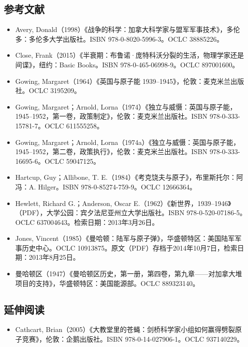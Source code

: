 \subsection{参考文献}
\begin{itemize}
\item Avery, Donald（1998）《战争的科学：加拿大科学家与盟军军事技术》，多伦多：多伦多大学出版社。ISBN 978-0-8020-5996-3。OCLC 38885226。
\item Close, Frank（2015）《半衰期：布鲁诺·庞特科沃分裂的生活，物理学家还是间谍》，纽约：Basic Books。ISBN 978-0-465-06998-9。OCLC 897001600。
\item Gowing, Margaret（1964）《英国与原子能 1939–1945》，伦敦：麦克米兰出版社。OCLC 3195209。
\item Gowing, Margaret；Arnold, Lorna（1974）《独立与威慑：英国与原子能，1945–1952，第一卷，政策制定》，伦敦：麦克米兰出版社。ISBN 978-0-333-15781-7。OCLC 611555258。
\item Gowing, Margaret；Arnold, Lorna（1974a）《独立与威慑：英国与原子能，1945–1952，第二卷，政策执行》，伦敦：麦克米兰出版社。ISBN 978-0-333-16695-6。OCLC 59047125。
\item Hartcup, Guy；Allibone, T. E.（1984）《考克饶夫与原子》，布里斯托尔：阿冯：A. Hilger。ISBN 978-0-85274-759-9。OCLC 12666364。
\item Hewlett, Richard G.；Anderson, Oscar E.（1962）《新世界，1939–1946》（PDF），大学公园：宾夕法尼亚州立大学出版社。ISBN 978-0-520-07186-5。OCLC 637004643。检索日期：2013年3月26日。
\item Jones, Vincent（1985）《曼哈顿：陆军与原子弹》，华盛顿特区：美国陆军军事历史中心。OCLC 10913875。原文（PDF）存档于2014年10月7日，检索日期：2013年8月25日。
\item 曼哈顿区（1947）《曼哈顿区历史，第一册，第四卷，第九章——对加拿大堆项目的支持》，华盛顿特区：美国能源部。OCLC 889323140。
\end{itemize}
\subsection{延伸阅读}
\begin{itemize}
\item Cathcart, Brian（2005）《大教堂里的苍蝇：剑桥科学家小组如何赢得劈裂原子竞赛》，伦敦：企鹅出版社。ISBN 978-0-14-027906-1。OCLC 937140229。
\end{itemize}
